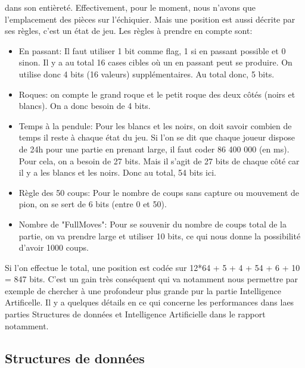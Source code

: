 \documentclass{article}
\begin{document}
dans son entièreté. Effectivement, pour le moment, nous n'avons que l'emplacement des pièces sur l'échiquier. Mais une position
est aussi décrite par ses règles, c'est un état de jeu. Les règles à prendre en compte sont:\\
\begin{itemize}
    \item En passant: Il faut utiliser 1 bit comme flag, 1 si en passant possible et 0 sinon. Il y a au total 16 cases cibles où
    un en passant peut se produire. On utilise donc 4 bits (16 valeurs) supplémentaires. Au total donc, 5 bits.
    \item Roques: on compte le grand roque et le petit roque des deux côtés (noirs et blancs). On a donc besoin de 4 bits.
    \item Temps à la pendule: Pour les blancs et les noirs, on doit savoir combien de temps il reste à chaque état du jeu. Si
    l'on se dit que chaque joueur dispose de 24h pour une partie en prenant large, il faut coder 86 400 000 (en ms). Pour cela,
    on a besoin de 27 bits. Mais il s'agit de 27 bits de chaque côté car il y a les blancs et les noirs. Donc au total, 54 bits ici.
    \item Règle des 50 coups: Pour le nombre de coups sans capture ou mouvement de pion, on se sert de 6 bits (entre 0 et 50).
    \item Nombre de "FullMoves": Pour se souvenir du nombre de coups total de la partie, on va prendre large et utiliser 10 bits,
    ce qui nous donne la possibilité d'avoir 1000 coups.
\end{itemize}

Si l'on effectue le total, une position est codée sur 12*64 + 5 + 4 + 54 + 6 + 10 = 847 bits.
C'est un gain très conséquent qui va notamment nous permettre par exemple de chercher à une profondeur plus grande pur la partie
Intelligence Artificelle. Il y a quelques détails en ce qui concerne les performances dans laes parties Structures de données et
Intelligence Artificielle dans le rapport notamment.

\subsection{Structures de données}
\end{document}
